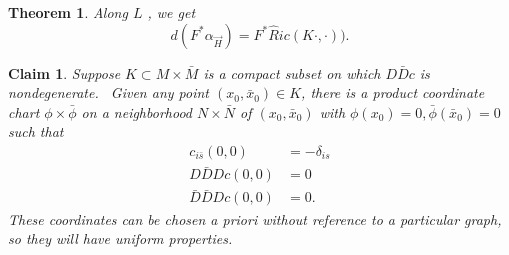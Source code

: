 \documentclass[12pt,letterpaper]{amsart}%
\newcounter{mycounter}
\numberwithin{mycounter}{section}
\newtheorem{theorem}[mycounter]{Theorem}
\theoremstyle{plain}
\newtheorem{claim}[mycounter]{Claim}
\numberwithin{equation}{section}
\theoremstyle{definition}
\begin{document}
\begin{theorem}
Along $L$ \label{Dazord}, we get
\begin{equation}
d\left(  F^{\ast}\alpha_{\vec{H}}\right)  =F^{\ast}{\hat{R}ic}(K\cdot,\cdot)).
\end{equation}

\end{theorem}


























\iffalse


\begin{claim}
Suppose $K\subset M\times\bar{M}$ is a compact subset on which $D\bar{D}c$ is
nondegenerate. \ Given any point $\left(  x_{0},\bar{x}_{0}\right)  \in K$,
there is a product coordinate chart $\phi\times\bar{\phi}$ on a neighborhood
$N\times\bar{N}$ of $\left(  x_{0},\bar{x}_{0}\right)  $ with $\phi
(x_{0})=0,\bar{\phi}(\bar{x}_{0})=0$ such that
\begin{align*}
c_{i\bar{s}}\left(  0,0\right)   &  =-\delta_{is}\\
D\bar{D}Dc\left(  0,0\right)   &  =0\\
\bar{D}\bar{D}Dc\left(  0,0\right)   &  =0.
\end{align*} These coordinates can be chosen a priori without reference to a particular graph, so they will have uniform properties. 
\end{claim}
\end{document}
